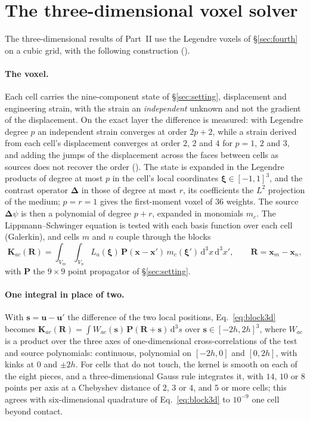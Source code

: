 \documentclass[11pt,a4paper]{article}
\newcommand{\bK}{\mathbf{K}}
\newcommand{\bD}{\boldsymbol{\Delta}}
\newcommand{\bP}{\mathbf{P}}
\newcommand{\dd}{\mathrm{d}}
\begin{document}
\FloatBarrier

\section{The three-dimensional voxel solver}\label{app:solver}

The three-dimensional results of Part~II use the Legendre voxels
of \S\ref{sec:fourth} on a cubic grid, with the following construction
().

\paragraph{The voxel.} Each cell carries the nine-component state of \S\ref{sec:setting}, displacement
and engineering strain, with the strain an \emph{independent} unknown and not the gradient of the
displacement. On the exact layer the difference is measured: with Legendre degree $p$ an independent
strain converges at order $2p+2$, while a strain derived from each cell's displacement converges at
order $2$, $2$ and $4$ for $p=1$, $2$ and $3$, and adding the jumps of the displacement across the faces
between cells as sources does not recover the order
(). The state is expanded in the Legendre
products of degree at most $p$ in the cell's local coordinates $\boldsymbol\xi\in[-1,1]^3$, and the
contrast operator $\bD$ in those of degree at most $r$, its coefficients the $L^2$ projection of the
medium; $p=r=1$ gives the first-moment voxel of $36$ weights. The source $\bD\psi$ is then a polynomial
of degree $p+r$, expanded in monomials $m_c$. The Lippmann--Schwinger equation is tested with each basis
function over each cell (Galerkin), and cells $m$ and $n$ couple through the blocks
\begin{equation}\label{eq:block3d}
  \bK_{ac}(\mathbf{R})=\int_{V_m}\!\int_{V_n}L_a(\boldsymbol\xi)\,\bP(\mathbf{x}-\mathbf{x}')\,
  m_c(\boldsymbol\xi')\,\dd^3x\,\dd^3x',\qquad \mathbf{R}=\mathbf{x}_m-\mathbf{x}_n,
\end{equation}
with $\bP$ the $9\times9$ point propagator of \S\ref{sec:setting}.

\paragraph{One integral in place of two.} With $\mathbf{s}=\mathbf{u}-\mathbf{u}'$ the difference of the
two local positions, Eq.~\eqref{eq:block3d} becomes
$\bK_{ac}(\mathbf{R})=\int W_{ac}(\mathbf{s})\,\bP(\mathbf{R}+\mathbf{s})\,\dd^3s$ over
$\mathbf{s}\in[-2h,2h]^3$, where $W_{ac}$ is a product over the three axes of one-dimensional
cross-correlations of the test and source polynomials: continuous, polynomial on $[-2h,0]$ and $[0,2h]$,
with kinks at $0$ and $\pm2h$. For cells that do not touch, the kernel is smooth on each of the eight
pieces, and a three-dimensional Gauss rule integrates it, with $14$, $10$ or $8$ points per axis at a
Chebyshev distance of $2$, $3$ or $4$, and $5$ or more cells; this agrees with six-dimensional quadrature
of Eq.~\eqref{eq:block3d} to $10^{-9}$ one cell beyond contact.
\end{document}

